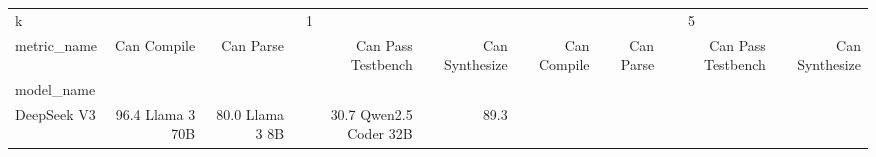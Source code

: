 \begin{tabular}{lrrrrrrrr}
\toprule
k & \multicolumn{4}{c}{1} & \multicolumn{4}{c}{5} \\
metric_name & Can Compile & Can Parse & Can Pass Testbench & Can Synthesize & Can Compile & Can Parse & Can Pass Testbench & Can Synthesize \\
model_name &  &  &  &  &  &  &  &  \\
\midrule
DeepSeek V3 & 96.4%
Llama 3 70B & 80.0%
Llama 3 8B & 30.7%
Qwen2.5 Coder 32B & 89.3%
\bottomrule
\end{tabular}
